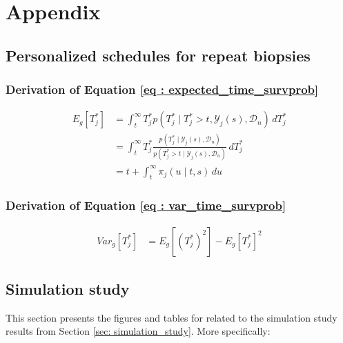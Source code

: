 
\section{Appendix}

\subsection{Personalized schedules for repeat biopsies}
\subsubsection{Derivation of Equation \ref{eq : expected_time_survprob}}
\begin{equation*}
\begin{split}
E_g[T^*_j] &= \int_t^{\infty} T^*_j p(T^*_j \mid T^*_j > t, \mathcal{Y}_j(s), \mathcal{D}_n)\,dT^*_j\\
&= \int_t^{\infty} T^*_j \frac{p(T^*_j \mid \mathcal{Y}_j(s), \mathcal{D}_n)}{p(T^*_j > t \mid \mathcal{Y}_j(s), \mathcal{D}_n)}\,dT^*_j\\
&= t + \int_t^\infty \pi_j(u \mid t, s) \,du
\end{split}
\end{equation*}

\subsubsection{Derivation of Equation \ref{eq : var_time_survprob}}
\begin{equation*}
\begin{split}
Var_g[T^*_j] &= E_g[(T^*_j)^2] - E_g[T^*_j]^2
\end{split}
\end{equation*}



\subsection{Simulation study}
This section presents the figures and tables for related to the simulation study results from Section \ref{sec: simulation_study}. More specifically:


